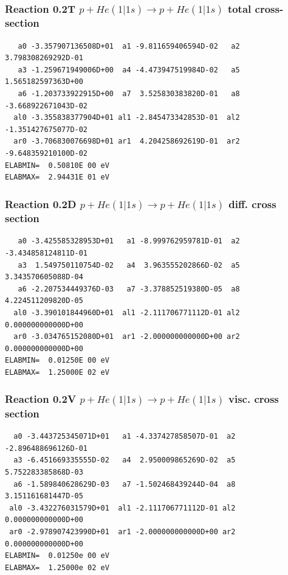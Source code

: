 \documentclass[12pt,dvips]{article}
\begin{document}
\subsubsection{
Reaction 0.2T   $ p + He(1|1s) \rightarrow p + He (1|1s)$ total cross-section
}



\begin{small}\begin{verbatim}
   a0 -3.357907136508D+01  a1 -9.811659406594D-02   a2  3.798308269292D-01
   a3 -1.259671949006D+00  a4 -4.473947519984D-02   a5  1.565182597363D+00
   a6 -1.203733922915D+00  a7  3.525830383820D-01   a8 -3.668922671043D-02
  al0 -3.355838377904D+01 al1 -2.845473342853D-01  al2 -1.351427675077D-02
  ar0 -3.706830076698D+01 ar1  4.204258692619D-01  ar2 -9.648359210100D-02
ELABMIN=  0.50810E 00 eV
ELABMAX=  2.94431E 01 eV
\end{verbatim}\end{small}

\subsubsection{
Reaction 0.2D    $p + He(1|1s) \rightarrow p + He (1|1s) $ diff. cross
section }


\begin{small}\begin{verbatim}
   a0 -3.425585328953D+01   a1 -8.999762959781D-01  a2 -3.434858124811D-01
   a3  1.549750110754D-02   a4  3.963555202866D-02  a5  3.343570605088D-04
   a6 -2.207534449376D-03   a7 -3.378852519380D-05  a8  4.224511209820D-05
  al0 -3.390101844960D+01  al1 -2.111706771112D-01 al2  0.000000000000D+00
  ar0 -3.034765152080D+01  ar1 -2.000000000000D+00 ar2  0.000000000000D+00
ELABMIN=  0.01250E 00 eV
ELABMAX=  1.25000E 02 eV
\end{verbatim}\end{small}


\subsubsection{
Reaction 0.2V   $ p + He(1|1s) \rightarrow p + He (1|1s) $ visc. cross
section }


\begin{small}\begin{verbatim}
  a0 -3.443725345071D+01   a1 -4.337427858507D-01  a2 -2.896488696126D-01
  a3 -6.451669335555D-02   a4  2.950009865269D-02  a5  5.752283385868D-03
  a6 -1.589840628629D-03   a7 -1.502468439244D-04  a8  3.151161681447D-05
 al0 -3.432276031579D+01  al1 -2.111706771112D-01 al2  0.000000000000D+00
 ar0 -2.978907423990D+01  ar1 -2.000000000000D+00 ar2  0.000000000000D+00
ELABMIN=  0.01250e 00 eV
ELABMAX=  1.25000e 02 eV
\end{verbatim}\end{small}
\end{document}
